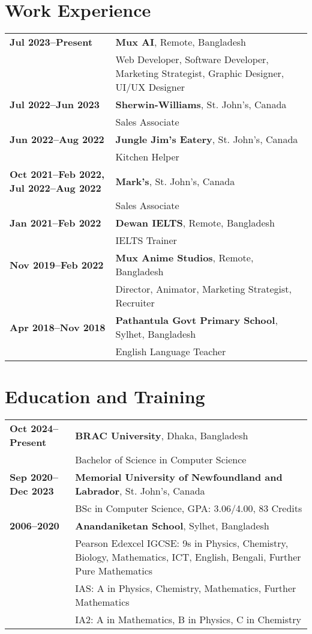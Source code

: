 \documentclass[10pt,a4paper]{article}
\begin{document}
\section*{Work Experience}
\begin{tabularx}{\textwidth}{@{}Y|X@{}}
    \textbf{Jul 2023--Present} & \textbf{Mux AI}, Remote, Bangladesh \\
    & Web Developer, Software Developer, Marketing Strategist, Graphic Designer, UI/UX Designer \\
    \hline
    \textbf{Jul 2022--Jun 2023} & \textbf{Sherwin-Williams}, St. John's, Canada \\
    & Sales Associate \\
    \hline
    \textbf{Jun 2022--Aug 2022} & \textbf{Jungle Jim's Eatery}, St. John's, Canada \\
    & Kitchen Helper \\
    \hline
    \textbf{Oct 2021--Feb 2022, Jul 2022--Aug 2022} & \textbf{Mark's}, St. John's, Canada \\
    & Sales Associate \\
    \hline
    \textbf{Jan 2021--Feb 2022} & \textbf{Dewan IELTS}, Remote, Bangladesh \\
    & IELTS Trainer \\
    \hline
    \textbf{Nov 2019--Feb 2022} & \textbf{Mux Anime Studios}, Remote, Bangladesh \\
    & Director, Animator, Marketing Strategist, Recruiter \\
    \hline
    \textbf{Apr 2018--Nov 2018} & \textbf{Pathantula Govt Primary School}, Sylhet, Bangladesh \\
    & English Language Teacher \\
\end{tabularx}

\section*{Education and Training}
\begin{tabularx}{\textwidth}{@{}Y|X@{}}
    \textbf{Oct 2024--Present} & \textbf{BRAC University}, Dhaka, Bangladesh \\
    & Bachelor of Science in Computer Science \\
    \hline
    \textbf{Sep 2020--Dec 2023} & \textbf{Memorial University of Newfoundland and Labrador}, St. John's, Canada \\
    & BSc in Computer Science, GPA: 3.06/4.00, 83 Credits \\
    \hline
    \textbf{2006--2020} & \textbf{Anandaniketan School}, Sylhet, Bangladesh \\
    & Pearson Edexcel IGCSE: 9s in Physics, Chemistry, Biology, Mathematics, ICT, English, Bengali, Further Pure Mathematics \\
    & IAS: A in Physics, Chemistry, Mathematics, Further Mathematics \\
    & IA2: A in Mathematics, B in Physics, C in Chemistry \\
\end{tabularx}
\end{document}
